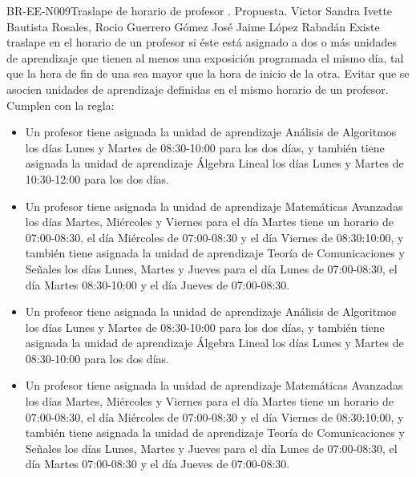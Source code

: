\begin{BusinessRule}{BR-EE-N009}{Traslape de horario de profesor}
	{\bcCondition}    %
	{\btEnabler}     %
	{\blControlling}    %
	.
	\BRItem[Estado] Propuesta.
	 Victor
	 Sandra Ivette Bautista Rosales, Rocio Guerrero Gómez
	 José Jaime López Rabadán
	\BRItem[Descripción] Existe traslape en el horario de un profesor si éste está asignado a dos o más unidades de aprendizaje que tienen al menos una exposición programada el mismo día, tal que la hora de fin de una sea mayor que la hora de inicio de la otra.
	\BRItem[Motivación] Evitar que se asocien unidades de aprendizaje definidas en el mismo horario de un profesor.
		 Cumplen con la regla: \cdtEmpty
		\begin{itemize}
			\item Un profesor tiene asignada la unidad de aprendizaje Análisis de Algoritmos los días Lunes y Martes de 08:30-10:00 para los dos días, y también tiene asignada la unidad de aprendizaje Álgebra Lineal los días Lunes y Martes de 10:30-12:00 para los dos días.
			\item Un profesor tiene asignada la unidad de aprendizaje Matemáticas Avanzadas los días Martes, Miércoles y Viernes para el día Martes tiene un horario de 07:00-08:30, el día Miércoles de 07:00-08:30 y el día Viernes de 08:30:10:00, y también tiene asignada la unidad de aprendizaje Teoría de Comunicaciones y Señales los días Lunes, Martes y Jueves para el día Lunes de 07:00-08:30, el día Martes 08:30-10:00 y el día Jueves de 07:00-08:30. 
		\end{itemize}
		\begin{itemize}
			\item Un profesor tiene asignada la unidad de aprendizaje Análisis de Algoritmos los días Lunes y Martes de 08:30-10:00 para los dos días, y también tiene asignada la unidad de aprendizaje Álgebra Lineal los días Lunes y Martes de 08:30-10:00 para los dos días.
			\item Un profesor tiene asignada la unidad de aprendizaje Matemáticas Avanzadas los días Martes, Miércoles y Viernes para el día Martes tiene un horario de 07:00-08:30, el día Miércoles de 07:00-08:30 y el día Viernes de 08:30:10:00, y también tiene asignada la unidad de aprendizaje Teoría de Comunicaciones y Señales los días Lunes, Martes y Jueves para el día Lunes de 07:00-08:30, el día Martes 07:00-08:30 y el día Jueves de 07:00-08:30. 
		\end{itemize}
\end{BusinessRule}

